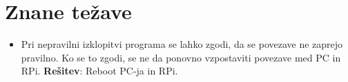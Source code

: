 \chapter{Znane težave}\label{cha:zakljucki}

\begin{itemize}
    \item Pri nepravilni izklopitvi programa se lahko zgodi, da se povezave ne zaprejo pravilno. Ko se to zgodi, se ne da ponovno vzpostaviti povezave med PC in RPi. \textbf{Rešitev}: Reboot PC-ja in RPi.
\end{itemize}